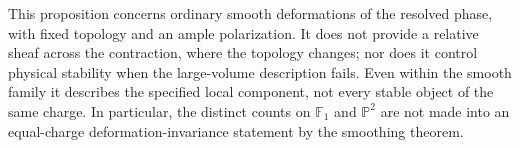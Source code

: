 This proposition concerns ordinary smooth deformations of the resolved
phase, with fixed topology and an ample polarization. It does not provide
a relative sheaf across the contraction, where the topology changes;
nor does it control physical stability when the large-volume description
fails. Even within the smooth family it describes the specified local
component, not every stable object of the same charge. In particular,
the distinct counts on $\mathbb F_1$ and $\mathbb P^2$ are not made into
an equal-charge deformation-invariance statement by the smoothing theorem.
